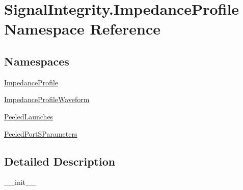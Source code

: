\hypertarget{namespaceSignalIntegrity_1_1ImpedanceProfile}{}\section{Signal\+Integrity.\+Impedance\+Profile Namespace Reference}
\label{namespaceSignalIntegrity_1_1ImpedanceProfile}
\subsection*{Namespaces}
\begin{DoxyCompactItemize}
\item 
 \hyperlink{namespaceSignalIntegrity_1_1ImpedanceProfile_1_1ImpedanceProfile}{Impedance\+Profile}
\item 
 \hyperlink{namespaceSignalIntegrity_1_1ImpedanceProfile_1_1ImpedanceProfileWaveform}{Impedance\+Profile\+Waveform}
\item 
 \hyperlink{namespaceSignalIntegrity_1_1ImpedanceProfile_1_1PeeledLaunches}{Peeled\+Launches}
\item 
 \hyperlink{namespaceSignalIntegrity_1_1ImpedanceProfile_1_1PeeledPortSParameters}{Peeled\+Port\+S\+Parameters}
\end{DoxyCompactItemize}


\subsection{Detailed Description}
\begin{DoxyVerb}__init__\end{DoxyVerb}
 